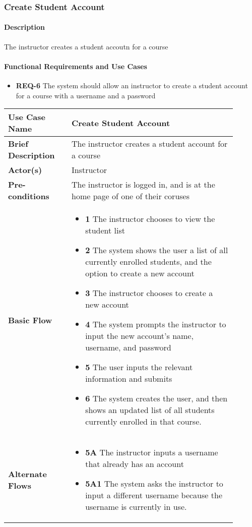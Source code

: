\documentclass{article}
\begin{document}
\subsubsection{Create Student Account}

\paragraph{Description} The instructor creates a student accoutn for a course

\paragraph{Functional Requirements and Use Cases}

\begin{itemize}
  \item \textbf{REQ-6} The system should allow an instructor to create a student account for a course with a username and a password
\end{itemize}

\vspace{0.2in}

\begin{tabular}{| p{0.25\linewidth} | p{0.65\linewidth} |}
  \hline
  \textbf{Use Case Name} & Create Student Account \\
  \hline
  \textbf{Brief Description} & The instructor creates a student account for a course \\
  \hline
  \textbf{Actor(s)} & Instructor \\
  \hline
  \textbf{Pre-conditions} & The instructor is logged in, and is at the home page of one of their coruses\\
  \hline
  \textbf{Basic Flow} & \begin{itemize}
    \item[] \textbf{1} The instructor chooses to view the student list
    \item[] \textbf{2} The system shows the user a list of all currently enrolled students, and the option to create a new account
    \item[] \textbf{3} The instructor chooses to create a new account
    \item[] \textbf{4} The system prompts the instructor to input the new account's name, username, and password
    \item[] \textbf{5} The user inputs the relevant information and submits
    \item[] \textbf{6} The system creates the user, and then shows an updated list of all students currently enrolled in that course.
  \end{itemize}\\
  \hline
  \textbf{Alternate Flows} & \begin{itemize}
    \item[] \textbf{5A} The instructor inputs a username that already has an account
    \item[] \textbf{5A1} The system asks the instructor to input a different username because the username is currently in use.
  \end{itemize} \\
  \hline
\end{tabular}
\end{document}
